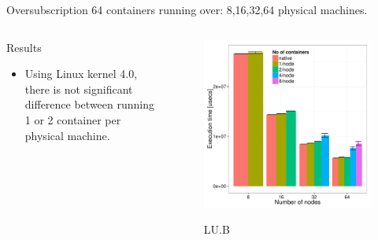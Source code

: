 \documentclass[presentation]{beamer}
\begin{document}
\begin{frame}[label=sec-3-4]{Oversubscription}
64 containers running over: 8,16,32,64 physical machines.

\begin{columns}
\begin{column}{0.5\textwidth}
\begin{block}{Results}

\begin{itemize}
\item Using Linux kernel 4.0, there is not significant difference between running 1 or 2 container per physical machine.
\end{itemize}
\end{block}
\end{column}

\begin{column}{0.5\textwidth}


\begin{figure}[!h]
  \center
  \includegraphics[scale=0.33]{figures/execution_time-tso-40.pdf}
  \label{fig:hpc}
  \caption{LU.B}
\end{figure}
\end{column}
\end{columns}
\end{frame}
\end{document}
